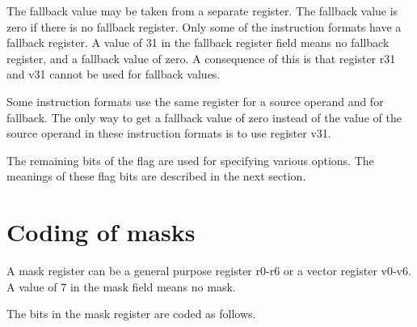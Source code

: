 \documentclass[forwardcom.tex]{subfiles}
\begin{document}
The fallback value may be taken from a separate register. The fallback value is zero if there is no fallback register. Only some of the instruction formats have a fallback register. A value of 31 in the fallback register field means no fallback register, and a fallback value of zero. A consequence of this is that register r31 and v31 cannot be used for fallback values. 
\vspace{2mm}

Some instruction formats use the same register for a source operand and for fallback. The only way to get a fallback value of zero instead of the value of the source operand in these instruction formats is to use register v31.
\vspace{2mm}

The remaining bits of the flag are used for specifying various options.
The meanings of these flag bits are described in the next section.

\section{Coding of masks}
A mask register can be a general purpose register r0-r6 or a vector register v0-v6. A value of 7 in the mask field means no mask.
\vspace{2mm}

The bits in the mask register are coded as follows.
\end{document}
